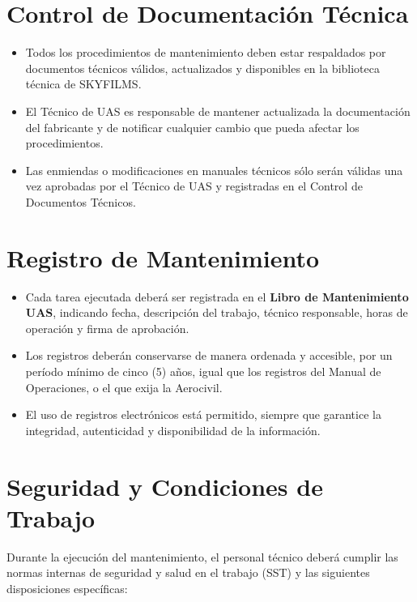 \section{Control de Documentación Técnica}

\begin{itemize}
    \item Todos los procedimientos de mantenimiento deben estar respaldados por documentos técnicos válidos, actualizados y disponibles en la biblioteca técnica de SKYFILMS.

    \item El Técnico de UAS es responsable de mantener actualizada la documentación del fabricante y de notificar cualquier cambio que pueda afectar los procedimientos.

    \item Las enmiendas o modificaciones en manuales técnicos sólo serán válidas una vez aprobadas por el Técnico de UAS y registradas en el Control de Documentos Técnicos.
\end{itemize}

\section{Registro de Mantenimiento}

\begin{itemize}
    \item Cada tarea ejecutada deberá ser registrada en el \textbf{Libro de Mantenimiento UAS}, indicando fecha, descripción del trabajo, técnico responsable, horas de operación y firma de aprobación.

    \item Los registros deberán conservarse de manera ordenada y accesible, por un período mínimo de cinco (5) años, igual que los registros del Manual de Operaciones, o el que exija la Aerocivil.

    \item El uso de registros electrónicos está permitido, siempre que garantice la integridad, autenticidad y disponibilidad de la información.
\end{itemize}

\section{Seguridad y Condiciones de Trabajo}
Durante la ejecución del mantenimiento, el personal técnico deberá cumplir las normas internas de seguridad y salud en el trabajo (SST) y las siguientes disposiciones específicas:

